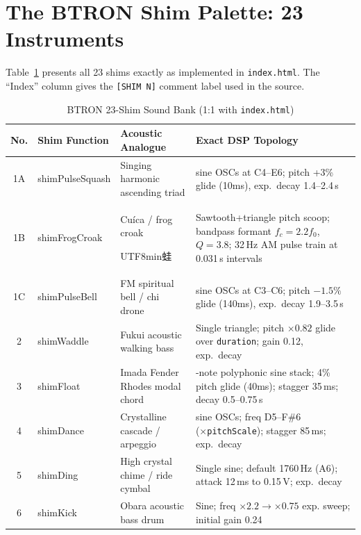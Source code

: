 \documentclass[10pt,journal,compsoc,twocolumn]{article}
\newcommand{\ja}[1]{\begin{CJK*}{UTF8}{min}#1\end{CJK*}}
\begin{document}
\section{The BTRON Shim Palette: 23 Instruments}
\label{sec:palette}

Table~\ref{tab:soundbank} presents all 23 shims exactly as implemented in
\texttt{index.html}.  The ``Index'' column gives the \texttt{[SHIM N]} comment
label used in the source.

\begin{table}[t]
\centering
\caption{BTRON 23-Shim Sound Bank (1:1 with \texttt{index.html})}
\label{tab:soundbank}
\scriptsize
\setlength{\tabcolsep}{3pt}
\renewcommand{\arraystretch}{1.12}
\begin{tabularx}{\textwidth}{@{}
  c
  >{\ttfamily\raggedright\arraybackslash}p{3.1cm}
  >{\raggedright\arraybackslash}p{3.4cm}
  >{\raggedright\arraybackslash}X
@{}}
\toprule
\textbf{No.} & \textbf{Shim Function} & \textbf{Acoustic Analogue} & \textbf{Exact DSP Topology} \\
\midrule
1A & shimPulseSquash  & Singing harmonic ascending triad  & 6 sine OSCs at C4--E6; pitch +3\% glide (10ms), exp.\ decay 1.4--2.4\,s \\
1B & shimFrogCroak    & Cu\'{i}ca / frog croak \ja{蛙}       & Sawtooth+triangle pitch scoop; bandpass formant $f_c=2.2f_0$, $Q=3.8$; 32\,Hz AM pulse train at 0.031\,s intervals \\
1C & shimPulseBell    & FM spiritual bell / chi drone     & 8 sine OSCs at C3--C6; pitch $-1.5\%$ glide (140ms), exp.\ decay 1.9--3.5\,s \\
2  & shimWaddle       & Fukui acoustic walking bass       & Single triangle; pitch $\times 0.82$ glide over \texttt{duration}; gain 0.12, exp.\ decay \\
3  & shimFloat        & Imada Fender Rhodes modal chord   & 4-note polyphonic sine stack; 4\% pitch glide (40ms); stagger 35\,ms; decay 0.5--0.75\,s \\
4  & shimDance        & Crystalline cascade / arpeggio    & 5 sine OSCs; freq D5--F\#6 (×\texttt{pitchScale}); stagger 85\,ms; exp.\ decay \\
5  & shimDing         & High crystal chime / ride cymbal  & Single sine; default 1760\,Hz (A6); attack 12\,ms to 0.15\,V; exp.\ decay \\
6  & shimKick         & Obara acoustic bass drum          & Sine; freq $\times 2.2 \to \times 0.75$ exp. sweep; initial gain 0.24 \\

\end{tabularx}
\end{table}
\end{document}
